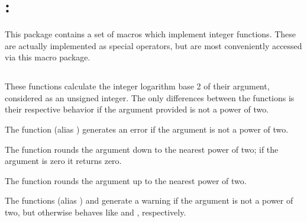 \section{: }
\label{sec:pkgifunc}

This package contains a set of macros which implement integer
functions. These are actually implemented as special operators, but
are most conveniently accessed via this macro package.

\subsection{}
\label{subsec:ilog2}

These functions calculate the integer logarithm base 2 of their
argument, considered as an unsigned integer. The only differences
between the functions is their respective behavior if the argument
provided is not a power of two.

The function  (alias ) generates
an error if the argument is not a power of two.

The function  rounds the argument down to the nearest
power of two; if the argument is zero it returns zero.

The function  rounds the argument up to the nearest
power of two.

The functions  (alias ) and
 generate a warning if the argument is not a power of
two, but otherwise behaves like  and ,
respectively.

